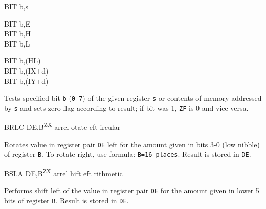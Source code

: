 \documentclass[12pt,twoside,openright,a4paper]{book}
\newcommand{\ZXN}{\textnormal{\textsuperscript{ZX}}}
\begin{document}
\begin{basedescript}{
	\desclabelstyle{\multilinelabel}
	\desclabelwidth{3cm}}
\begin{DetailItem}{BIT b,s}
\begin{DetailVariants}
			\columnbreak
			BIT b,E\\
			BIT b,H\\
			BIT b,L
			
			\columnbreak
			BIT b,(HL)\\
			BIT b,(IX+d)\\
			BIT b,(IY+d)
		\end{DetailVariants}

		Tests specified bit {\tt b} ({\tt 0-7}) of the given register {\tt s} or contents of memory addressed by {\tt s} and sets zero flag according to result; if bit was 1, {\tt ZF} is 0 and vice versa.

		\begin{DetailEffects}
			\FlagsBITr
		\end{DetailEffects}

		\begin{DetailTiming}
		\end{DetailTiming}

	\end{DetailItem}

	\begin{DetailItem}{BRLC DE,B\ZXN}
		{arrel otate eft ircular}
		{\SymBRLC}

		Rotates value in register pair {\tt DE} left for the amount given in bits 3-0 (low nibble) of register {\tt B}. To rotate right, use formula: {\tt B=16-places}. Result is stored in {\tt DE}.

		\DetailNoEffect

		\begin{DetailTiming}
			\DetailTime{}{2}{8}
		\end{DetailTiming}

	\end{DetailItem}

	\begin{DetailItem}{BSLA DE,B\ZXN}
		{arrel hift eft rithmetic}
		{\SymBSLA}

		Performs shift left of the value in register pair {\tt DE} for the amount given in lower 5 bits of register {\tt B}. Result is stored in {\tt DE}.

		\DetailNoEffect
		
		\begin{DetailTiming}
		\end{DetailTiming}


\end{DetailItem}
\end{basedescript}
\end{document}
